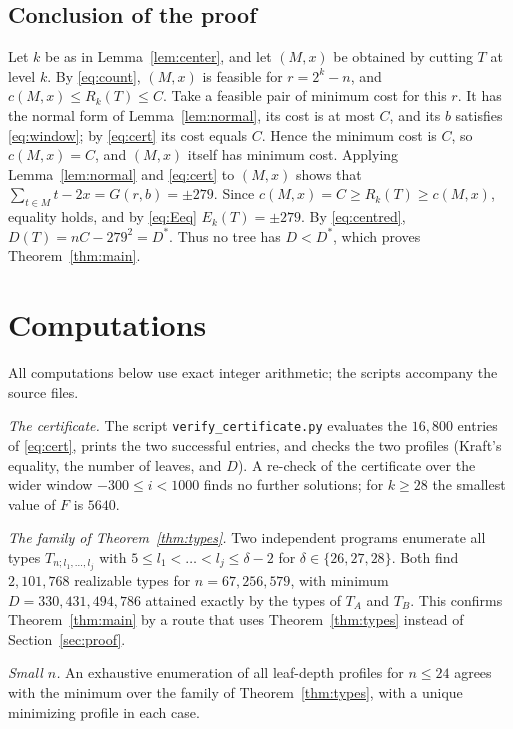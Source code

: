 \documentclass[11pt]{amsart}
\theoremstyle{remark}
\begin{document}
\subsection{Conclusion of the proof}

Let $k$ be as in Lemma~\ref{lem:center}, and let $(M,x)$ be obtained by cutting $T$ at level $k$.
By \eqref{eq:count}, $(M,x)$ is feasible for $r=2^k-n$, and $c(M,x)\le R_k(T)\le C$.
Take a feasible pair of minimum cost for this $r$.
It has the normal form of Lemma~\ref{lem:normal}, its cost is at most $C$, and its $b$ satisfies \eqref{eq:window}; by \eqref{eq:cert} its cost equals $C$.
Hence the minimum cost is $C$, so $c(M,x)=C$, and $(M,x)$ itself has minimum cost.
Applying Lemma~\ref{lem:normal} and \eqref{eq:cert} to $(M,x)$ shows that $\sum_{t\in M}t-2x=G(r,b)=\pm279$.
Since $c(M,x)=C\ge R_k(T)\ge c(M,x)$, equality holds, and by \eqref{eq:Eeq} $E_k(T)=\pm279$.
By \eqref{eq:centred}, $D(T)=nC-279^2=D^*$.
Thus no tree has $D<D^*$, which proves Theorem~\ref{thm:main}.

\section{Computations}\label{sec:computations}

All computations below use exact integer arithmetic; the scripts accompany the source files.

\emph{The certificate.} The script \texttt{verify\_certificate.py} evaluates the $16{,}800$ entries of \eqref{eq:cert}, prints the two successful entries, and checks the two profiles (Kraft's equality, the number of leaves, and $D$).
A re-check of the certificate over the wider window $-300\le i<1000$ finds no further solutions; for $k\ge28$ the smallest value of $F$ is $5640$.

\emph{The family of Theorem~\ref{thm:types}.} Two independent programs enumerate all types $T_{n;l_1,\dots,l_j}$ with $5\le l_1<\dots<l_j\le\delta-2$ for $\delta\in\{26,27,28\}$.
Both find $2{,}101{,}768$ realizable types for $n=67{,}256{,}579$, with minimum $D=330{,}431{,}494{,}786$ attained exactly by the types of $T_A$ and $T_B$.
This confirms Theorem~\ref{thm:main} by a route that uses Theorem~\ref{thm:types} instead of Section~\ref{sec:proof}.

\emph{Small $n$.} An exhaustive enumeration of all leaf-depth profiles for $n\le 24$ agrees with the minimum over the family of Theorem~\ref{thm:types}, with a unique minimizing profile in each case.
\end{document}
